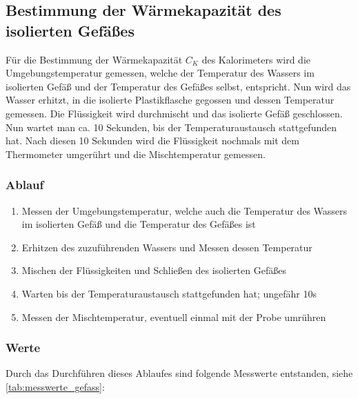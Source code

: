 \documentclass[11pt, ngerman]{scrartcl}
\begin{document}
\subsection{Bestimmung der Wärmekapazität des isolierten Gefäßes}
Für die Bestimmung der Wärmekapazität $C_K$ des Kalorimeters wird die
Umgebungstemperatur gemessen, welche der Temperatur des Wassers im isolierten
Gefäß und der Temperatur des Gefäßes selbst, entspricht. Nun wird das Wasser
erhitzt, in die isolierte Plastikflasche gegossen und dessen Temperatur gemessen.
Die Flüssigkeit wird durchmischt und das isolierte Gefäß geschlossen. Nun
wartet man ca. 10 Sekunden, bis der Temperaturaustausch stattgefunden hat. Nach
diesen 10 Sekunden wird die Flüssigkeit nochmals mit dem Thermometer umgerührt
und die Mischtemperatur gemessen.

\subsubsection{Ablauf}
\begin{enumerate}
    \item	Messen der Umgebungstemperatur, welche auch die Temperatur des Wassers im isolierten Gefäß und die Temperatur des Gefäßes ist
    \item	Erhitzen des zuzuführenden Wassers und Messen dessen Temperatur
    \item	Mischen der Flüssigkeiten und Schließen des isolierten Gefäßes
    \item	Warten bis der Temperaturaustausch stattgefunden hat; ungefähr 10s
    \item	Messen der Mischtemperatur, eventuell einmal mit der Probe umrühren 
\end{enumerate}

\subsubsection{Werte}
Durch das Durchführen dieses Ablaufes sind folgende Messwerte entstanden, siehe
\autoref{tab:messwerte_gefass}:
\end{document}
